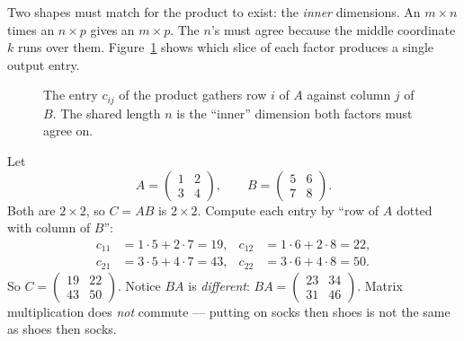 Two shapes must match for the product to exist: the \emph{inner} dimensions. An
$m\times n$ times an $n\times p$ gives an $m\times p$. The $n$'s must agree
because the middle coordinate $k$ runs over them. Figure~\ref{ch27:rowcol}
shows which slice of each factor produces a single output entry.

\begin{figure}[h]
\centering
{}
\caption{The entry $c_{ij}$ of the product gathers row $i$ of $A$ against
column $j$ of $B$. The shared length $n$ is the ``inner'' dimension both factors
must agree on.}
\label{ch27:rowcol}
\end{figure}

\begin{example}
\label{ch27:product-trace}
Let
$$
A=\begin{pmatrix}1 & 2\\ 3 & 4\end{pmatrix},\qquad
B=\begin{pmatrix}5 & 6\\ 7 & 8\end{pmatrix}.
$$
Both are $2\times 2$, so $C=AB$ is $2\times 2$. Compute each entry by
``row of $A$ dotted with column of $B$'':
\begin{align*}
c_{11} &= 1\cdot 5+2\cdot 7 = 19, & c_{12} &= 1\cdot 6+2\cdot 8 = 22, \\
c_{21} &= 3\cdot 5+4\cdot 7 = 43, & c_{22} &= 3\cdot 6+4\cdot 8 = 50.
\end{align*}
So $C=\begin{pmatrix}19 & 22\\ 43 & 50\end{pmatrix}$. Notice $BA$ is
\emph{different}: $BA=\begin{pmatrix}23 & 34\\ 31 & 46\end{pmatrix}$. Matrix
multiplication does \emph{not} commute --- putting on socks then
shoes is not the same as shoes then socks.
\end{example}

